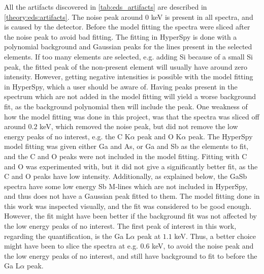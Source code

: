 All the artifacts discovered in \cref{tab:eds_artifacts} are described in \cref{theory:eds:artifacts}.
The noise peak around $0$ keV is present in all spectra, and is caused by the detector.
Before the model fitting the spectra were sliced after the noise peak to avoid bad fitting.
The fitting in HyperSpy is done with a polynomial background and Gaussian peaks for the lines present in the selected elements.
If too many elements are selected, e.g. adding Si because of a small Si peak, the fitted peak of the non-present element will usually have around zero intensity.
However, getting negative intensities is possible with the model fitting in HyperSpy, which a user should be aware of.
Having peaks present in the spectrum which are not added in the model fitting will yield a worse background fit, as the background polynomial then will include the peak.
One weakness of how the model fitting was done in this project, was that the spectra was sliced off around $0.2$ keV, which removed the noise peak, but did not remove the low energy peaks of no interest, e.g. the C K$\alpha$ peak and O K$\alpha$ peak.
The HyperSpy model fitting was given either Ga and As, or Ga and Sb as the elements to fit, and the C and O peaks were not included in the model fitting.
Fitting with C and O was experimented with, but it did not give a significantly better fit, as the C and O peaks have low intensity.
Additionally, as explained below, the GaSb spectra have some low energy Sb M-lines which are not included in HyperSpy, and thus does not have a Gaussian peak fitted to them.
The model fitting done in this work was inspected visually, and the fit was considered to be good enough.
However, the fit might have been better if the background fit was not affected by the low energy peaks of no interest.
The first peak of interest in this work, regarding the quantification, is the Ga L$\alpha$ peak at $1.1$ keV.
Thus, a better choice might have been to slice the spectra at e.g. $0.6$ keV, to avoid the noise peak and the low energy peaks of no interest, and still have background to fit to before the Ga L$\alpha$ peak.



